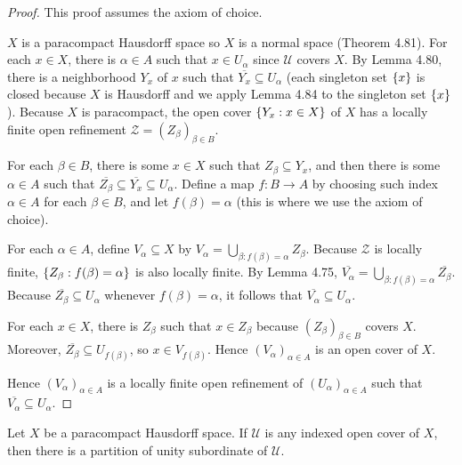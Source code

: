 \begin{proof}
	This proof assumes the axiom of choice.

	$X$ is a paracompact Hausdorff space so $X$ is a normal space (Theorem 4.81). For each $x\in X$, there is $\alpha\in A$ such that $x\in U_{\alpha}$ since $\mathscr{U}$ covers $X$. By Lemma 4.80, there is a neighborhood $Y_{x}$ of $x$ such that $\overline{Y_{x}} \subseteq U_{\alpha}$ (each singleton set $\left\{{x}\right\}$ is closed because $X$ is Hausdorff and we apply Lemma 4.84 to the singleton set $\left\{{x}\right\}$). Because $X$ is paracompact, the open cover $\left\{{ Y_{x} : x\in X }\right\}$ of $X$ has a locally finite open refinement $\mathcal{Z} = {(Z_{\beta})}_{\beta\in B}$.

	For each $\beta\in B$, there is some $x\in X$ such that $Z_{\beta} \subseteq Y_{x}$, and then there is some $\alpha\in A$ such that $\overline{Z_{\beta}} \subseteq \overline{Y_{x}} \subseteq U_{\alpha}$. Define a map $f: B\to A$ by choosing such index $\alpha\in A$ for each $\beta\in B$, and let $f(\beta) = \alpha$ (this is where we use the axiom of choice).

	For each $\alpha\in A$, define $V_{\alpha} \subseteq X$ by $V_{\alpha} = \bigcup_{\beta : f(\beta) = \alpha} Z_{\beta}$. Because $\mathcal{Z}$ is locally finite, $\left\{{ Z_{\beta} : f(\beta) = \alpha }\right\}$ is also locally finite. By Lemma 4.75, $\overline{V_{\alpha}} = \bigcup_{\beta: f(\beta) = \alpha}\overline{Z_{\beta}}$. Because $\overline{Z_{\beta}} \subseteq U_{\alpha}$ whenever $f(\beta) = \alpha$, it follows that $\overline{V_{\alpha}} \subseteq U_{\alpha}$.

	For each $x\in X$, there is $Z_{\beta}$ such that $x\in Z_{\beta}$ because ${(Z_{\beta})}_{\beta\in B}$ covers $X$. Moreover, $\overline{Z_{\beta}} \subseteq U_{f(\beta)}$, so $x \in V_{f(\beta)}$. Hence ${(V_{\alpha})}_{\alpha\in A}$ is an open cover of $X$.

	Hence ${(V_{\alpha})}_{\alpha\in A}$ is a locally finite open refinement of ${(U_{\alpha})}_{\alpha\in A}$ such that $\overline{V_{\alpha}} \subseteq U_{\alpha}$.
\end{proof}

\begin{theorem}{4.85}\label{theorem:4.85}
	Let $X$ be a paracompact Hausdorff space. If $\mathscr{U}$ is any indexed open cover of $X$, then there is a partition of unity subordinate of $\mathscr{U}$.
\end{theorem}

